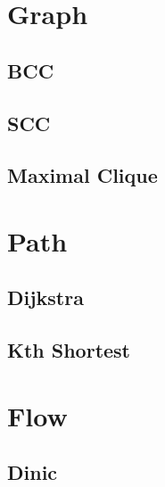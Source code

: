 \documentclass[10pt,twocolumn,oneside]{article}
\begin{document}
    \section{Graph}
    \subsection{BCC}
    
    \subsection{SCC}
    
    \subsection{Maximal Clique}
    

    \section{Path}
    \subsection{Dijkstra}
    \subsection{Kth Shortest}
    

    \section{Flow}
    \subsection{Dinic}
    
\end{document}
